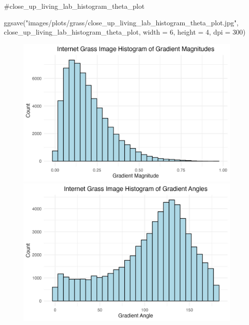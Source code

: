 \documentclass[
  letterpaper,
  DIV=11,
  numbers=noendperiod]{scrreprt}
\newenvironment{Shaded}{\begin{snugshade}}{\end{snugshade}}
\newcommand{\AttributeTok}[1]{\textcolor[rgb]{0.40,0.45,0.13}{#1}}
\newcommand{\CommentTok}[1]{\textcolor[rgb]{0.37,0.37,0.37}{#1}}
\newcommand{\DecValTok}[1]{\textcolor[rgb]{0.68,0.00,0.00}{#1}}
\newcommand{\FunctionTok}[1]{\textcolor[rgb]{0.28,0.35,0.67}{#1}}
\newcommand{\NormalTok}[1]{\textcolor[rgb]{0.00,0.23,0.31}{#1}}
\newcommand{\StringTok}[1]{\textcolor[rgb]{0.13,0.47,0.30}{#1}}
\begin{document}
\begin{Shaded}
\begin{Highlighting}[]
\CommentTok{\#close\_up\_living\_lab\_histogram\_theta\_plot}

\FunctionTok{ggsave}\NormalTok{(}\StringTok{"images/plots/grass/close\_up\_living\_lab\_histogram\_theta\_plot.jpg"}\NormalTok{, close\_up\_living\_lab\_histogram\_theta\_plot, }\AttributeTok{width =} \DecValTok{6}\NormalTok{, }\AttributeTok{height =} \DecValTok{4}\NormalTok{, }\AttributeTok{dpi =} \DecValTok{300}\NormalTok{)}
\end{Highlighting}
\end{Shaded}

\begin{figure}

\begin{minipage}{0.33\linewidth}
\includegraphics{images/plots/grass/internet_grass_histogram_mag_plot.jpg}
\includegraphics{images/plots/grass/internet_grass_histogram_theta_plot.jpg}\end{minipage}%

\end{figure}
\end{document}
